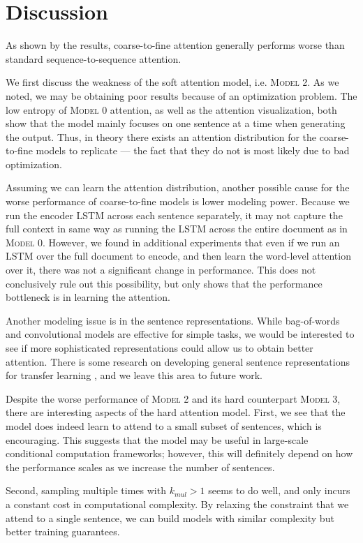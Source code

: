 \documentclass[12pt]{report}
\begin{document}
\section{Discussion}

As shown by the results, coarse-to-fine attention generally performs worse than standard sequence-to-sequence attention.

We first discuss the weakness of the soft attention model, i.e. \textsc{Model 2}. As we noted, we may be obtaining poor results because of an optimization problem. The low entropy of \textsc{Model 0} attention, as well as the attention visualization, both show that the model mainly focuses on one sentence at a time when generating the output. Thus, in theory there exists an attention distribution for the coarse-to-fine models to replicate --- the fact that they do not is most likely due to bad optimization.

Assuming we can learn the attention distribution, another possible cause for the worse performance of coarse-to-fine models is lower modeling power. Because we run the encoder LSTM across each sentence separately, it may not capture the full context in same way as running the LSTM across the entire document as in \textsc{Model 0}.
However, we found in additional experiments that even if we run an LSTM over the full document to encode, and then learn the word-level attention over it, there was not a significant change in performance. This does not conclusively rule out this possibility, but only shows that the performance bottleneck is in learning the attention.

Another modeling issue is in the sentence representations. While bag-of-words and convolutional models are effective for simple tasks, we would be interested to see if more sophisticated representations could allow us to obtain better attention. There is some research on developing general sentence representations for transfer learning \citep{Bowman2015}, and we leave this area to future work.


Despite the worse performance of \textsc{Model 2} and its hard counterpart \textsc{Model 3}, there are interesting aspects of the hard attention model. First, we see that the model does indeed learn to attend to a small subset of sentences, which is encouraging. This suggests that the model may be useful in large-scale conditional computation frameworks; however, this will definitely depend on how the performance scales as we increase the number of sentences.

Second, sampling multiple times with $k_{mul} > 1$ seems to do well, and only incurs a constant cost in computational complexity. By relaxing the constraint that we attend to a single sentence, we can build models with similar complexity but better training guarantees. 
\end{document}
